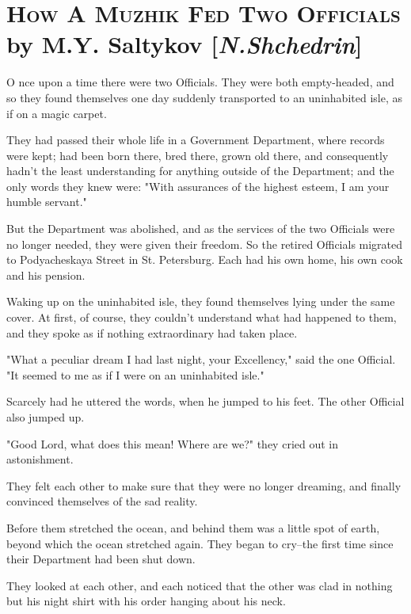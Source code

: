 \chapter{\textsc{How A Muzhik Fed Two Officials}\\
\small \hspace{20pt}
by M.Y. Saltykov [\emph{N.Shchedrin}]}

\lettrine[lines=3,lhang=0.11,lraise=0,loversize=0.05]{O}{}%
nce upon a time there were two Officials. They were both
empty-headed, and so they found themselves one day suddenly
transported to an uninhabited isle, as if on a magic carpet.

They had passed their whole life in a Government Department, where
records were kept; had been born there, bred there, grown old there,
and consequently hadn't the least understanding for anything outside
of the Department; and the only words they knew were: "With assurances
of the highest esteem, I am your humble servant."

But the Department was abolished, and as the services of the two
Officials were no longer needed, they were given their freedom. So the
retired Officials migrated to Podyacheskaya Street in St. Petersburg.
Each had his own home, his own cook and his pension.

Waking up on the uninhabited isle, they found themselves lying under
the same cover. At first, of course, they couldn't understand what had
happened to them, and they spoke as if nothing extraordinary had taken
place.

"What a peculiar dream I had last night, your Excellency," said the
one Official. "It seemed to me as if I were on an uninhabited isle."

Scarcely had he uttered the words, when he jumped to his feet. The
other Official also jumped up.

"Good Lord, what does this mean! Where are we?" they cried out in
astonishment.

They felt each other to make sure that they were no longer dreaming,
and finally convinced themselves of the sad reality.

Before them stretched the ocean, and behind them was a little spot of
earth, beyond which the ocean stretched again. They began to cry--the
first time since their Department had been shut down.

They looked at each other, and each noticed that the other was clad in
nothing but his night shirt with his order hanging about his neck.

